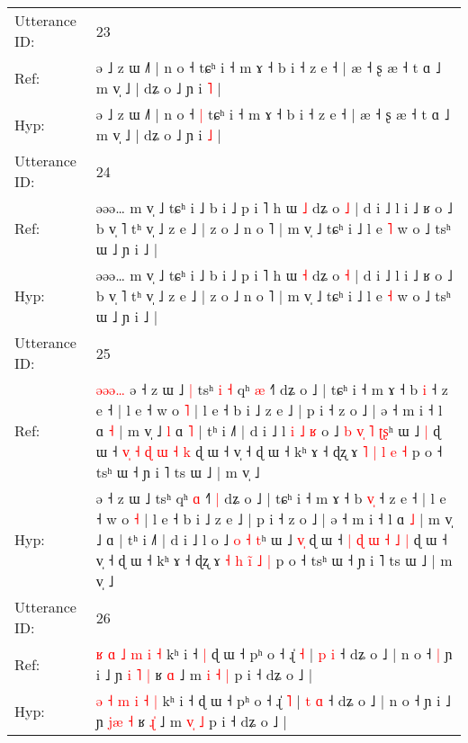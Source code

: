 \documentclass[10pt]{article}
\DeclareRobustCommand{\hl}[1]{{\textcolor{red}{#1}}}
\begin{document}
\begin{longtable}{ll}
 \\
\midrule
Utterance ID: & 23 \\
Ref: & ə ˩ z ɯ ˩˥ | n o ˧\hl{}\hl{} tɕʰ i ˧ m ɤ ˧ b i ˧ z e ˧ | æ ˧ ʂ æ ˧ t ɑ ˩ m v̩ ˩ | dʑ o ˩ ɲ i \hl{˥} |
 \\
Hyp: & ə ˩ z ɯ ˩˥ | n o ˧\hl{ }\hl{|} tɕʰ i ˧ m ɤ ˧ b i ˧ z e ˧ | æ ˧ ʂ æ ˧ t ɑ ˩ m v̩ ˩ | dʑ o ˩ ɲ i \hl{˩} |
 \\
\midrule
Utterance ID: & 24 \\
Ref: & əəə… m v̩ ˩ tɕʰ i ˩ b i ˩ p i ˥ h ɯ \hl{˩} dʑ o \hl{˩} | d i ˩ l i ˩ ʁ o ˩ b v̩ ˥ tʰ v̩ ˩ z e ˩ | z o ˩ n o ˥ | m v̩ ˩ tɕʰ i ˩ l e \hl{˥} w o ˩ tsʰ ɯ ˩ ɲ i ˩ |
 \\
Hyp: & əəə… m v̩ ˩ tɕʰ i ˩ b i ˩ p i ˥ h ɯ \hl{˧} dʑ o \hl{˧} | d i ˩ l i ˩ ʁ o ˩ b v̩ ˥ tʰ v̩ ˩ z e ˩ | z o ˩ n o ˥ | m v̩ ˩ tɕʰ i ˩ l e \hl{˧} w o ˩ tsʰ ɯ ˩ ɲ i ˩ |
 \\
\midrule
Utterance ID: & 25 \\
Ref: & \hl{ə}\hl{ə}\hl{ə}\hl{…}\hl{ }ə ˧ z ɯ ˩\hl{ }\hl{|} tsʰ\hl{ }\hl{i}\hl{ }\hl{˧} qʰ \hl{æ} ˧˥\hl{}\hl{} dʑ o ˩ | tɕʰ i ˧ m ɤ ˧ b \hl{}\hl{i} ˧ z e ˧ | l e ˧ w o \hl{˥} | l e ˧ b i ˩ z e ˩ | p i ˧ z o ˩ | ə ˧ m i ˧ l ɑ \hl{˧} | m v̩ ˩\hl{ }\hl{l} ɑ\hl{ }\hl{˥} | tʰ i ˩˥ | d i ˩ l\hl{ }\hl{i}\hl{ }\hl{˩}\hl{ }\hl{ʁ} o ˩\hl{ }\hl{b} \hl{v}\hl{̩} \hl{˥} \hl{ʈ}\hl{ʂ}ʰ ɯ ˩ \hl{}\hl{|} ɖ ɯ ˧ \hl{v}\hl{̩} \hl{˧} \hl{ɖ} \hl{ɯ} \hl{˧} \hl{k} ɖ ɯ ˧ v̩ ˧ ɖ ɯ ˧ kʰ ɤ ˧ ɖʐ ɤ \hl{˥} \hl{|} \hl{}\hl{l} \hl{e} \hl{˧} p o ˧ tsʰ ɯ ˧ ɲ i ˥ ts ɯ ˩ | m v̩ ˩
 \\
Hyp: & \hl{}\hl{}\hl{}\hl{}\hl{}ə ˧ z ɯ ˩\hl{}\hl{} tsʰ\hl{}\hl{}\hl{}\hl{} qʰ \hl{ɑ} ˧˥\hl{ }\hl{|} dʑ o ˩ | tɕʰ i ˧ m ɤ ˧ b \hl{v}\hl{̩} ˧ z e ˧ | l e ˧ w o \hl{˧} | l e ˧ b i ˩ z e ˩ | p i ˧ z o ˩ | ə ˧ m i ˧ l ɑ \hl{˩} | m v̩ ˩\hl{}\hl{} ɑ\hl{}\hl{} | tʰ i ˩˥ | d i ˩ l\hl{}\hl{}\hl{}\hl{}\hl{}\hl{} o ˩\hl{}\hl{} \hl{}\hl{o} \hl{˧} \hl{}\hl{t}ʰ ɯ ˩ \hl{v}\hl{̩} ɖ ɯ ˧ \hl{}\hl{|} \hl{ɖ} \hl{ɯ} \hl{˧} \hl{˩} \hl{|} ɖ ɯ ˧ v̩ ˧ ɖ ɯ ˧ kʰ ɤ ˧ ɖʐ ɤ \hl{˧} \hl{h} \hl{i}\hl{̃} \hl{˩} \hl{|} p o ˧ tsʰ ɯ ˧ ɲ i ˥ ts ɯ ˩ | m v̩ ˩
 \\
\midrule
Utterance ID: & 26 \\
Ref: & \hl{ʁ} \hl{ɑ} \hl{˩} \hl{m} \hl{i} \hl{˧} kʰ i ˧\hl{ }\hl{|} ɖ ɯ ˧ pʰ o ˧ ɻ̍ \hl{˧} | \hl{p} \hl{i} ˧ dʑ o ˩ | n o ˧\hl{ }\hl{|} ɲ i ˩ ɲ \hl{i}\hl{ }\hl{˥} \hl{|} ʁ \hl{}\hl{ɑ} ˩ m \hl{i}\hl{ }\hl{˧} \hl{|} p i ˧ dʑ o ˩ |
 \\
Hyp: & \hl{ə} \hl{˧} \hl{m} \hl{i} \hl{˧} \hl{|} kʰ i ˧\hl{}\hl{} ɖ ɯ ˧ pʰ o ˧ ɻ̍ \hl{˥} | \hl{t} \hl{ɑ} ˧ dʑ o ˩ | n o ˧\hl{}\hl{} ɲ i ˩ ɲ \hl{}\hl{j}\hl{æ} \hl{˧} ʁ \hl{ɻ}\hl{̍} ˩ m \hl{}\hl{v}\hl{̩} \hl{˩} p i ˧ dʑ o ˩ |

\end{longtable}
\end{document}
